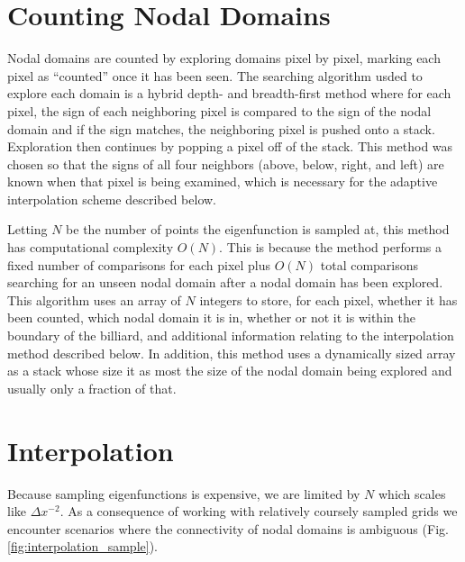 \documentclass{report}
\begin{document}
\section{Counting Nodal Domains}
Nodal domains are counted by exploring domains pixel by pixel, marking each pixel as ``counted'' once it has been seen. The searching algorithm usded to explore each domain is a hybrid depth- and breadth-first method where for each pixel, the sign of each neighboring pixel is compared to the sign of the nodal domain and if the sign matches, the neighboring pixel is pushed onto a stack. Exploration then continues by popping a pixel off of the stack. This method was chosen so that the signs of all four neighbors (above, below, right, and left) are known when that pixel is being examined, which is necessary for the adaptive interpolation scheme described below.

Letting $N$ be the number of points the eigenfunction is sampled at, this method has computational complexity $O(N)$. This is because the method performs a fixed number of comparisons for each pixel plus $O(N)$ total comparisons searching for an unseen nodal domain after a nodal domain has been explored. This algorithm uses an array of $N$ integers to store, for each pixel, whether it has been counted, which nodal domain it is in, whether or not it is within the boundary of the billiard, and additional information relating to the interpolation method described below. In addition, this method uses a dynamically sized array as a stack whose size it as most the size of the nodal domain being explored and usually only a fraction of that.

\section{Interpolation}
Because sampling eigenfunctions is expensive, we are limited by $N$ which scales like $\Delta x ^{-2}$. As a consequence of working with relatively coursely sampled grids we encounter scenarios where the connectivity of nodal domains is ambiguous (Fig. \ref{fig:interpolation_sample}).
\end{document}

